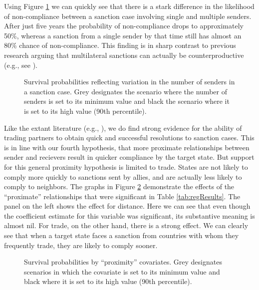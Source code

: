 Using Figure \ref{fig:surv1} we can quickly see that there is a stark difference in the likelihood of non-compliance between a sanction case involving single and multiple senders. After just five years the probability of non-compliance drops to approximately 50\%, whereas a sanction from a single sender by that time still has almost an 80\% chance of non-compliance. This finding is in sharp contrast to previous research arguing that multilateral sanctions can actually be counterproductive (e.g., see \citealp{drezner2000bargaining}).

\newpage
\begin{figure}[ht]
	\centering
	\caption{Survival probabilities reflecting variation in the number of senders in a sanction case. Grey designates the scenario where the number of senders is set to its minimum value and black the scenario where it is set to its high value (90th percentile).}
	\resizebox{0.7\textwidth}{!}{}
	\label{fig:surv1}
\end{figure}
\newpage

Like the extant literature (e.g., \citealp{mclean2010friends}), we do find strong evidence for the ability of trading partners to obtain quick and successful resolutions to sanction cases. This is in line with our fourth hypothesis, that more proximate relationships between sender and recievers result in quicker compliance by the target state. But support for this general proximity hypothesis is limited to trade. States are not likely to comply more quickly to sanctions sent by allies, and are actually less likely to comply to neighbors. The graphs in Figure \ref{fig:surv2} demonstrate the effects of the ``proximate'' relationships that were significant in Table \ref{tab:regResults}. The panel on the left shows the effect for distance. Here we can see that even though the coefficient estimate for this variable was significant, its substantive meaning is almost nil. For trade, on the other hand, there is a strong effect. We can clearly see that when a target state faces a sanction from countries with whom they frequently trade, they are likely to comply sooner.

\newpage
\begin{figure}[ht]
	\centering
	\caption{Survival probabilities by ``proximity'' covariates. Grey designates scenarios in which the covariate is set to its minimum value and black where it is set to its high value (90th percentile).}
	\resizebox{1\textwidth}{!}{}	
	\label{fig:surv2}
\end{figure}
\newpage

